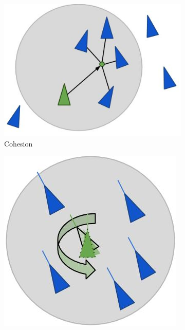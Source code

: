 \begin{figure}[h]
    \centering
    \begin{subfigure}[b]{0.3\textwidth}
        \centering
        \includegraphics[width=\textwidth]{images/boid_cohesion}
        \caption{Cohesion}
        \label{fig:boid_coh}
    \end{subfigure}
    \hfill
    \begin{subfigure}[b]{0.23\textwidth}
        \centering
        \includegraphics[width=\textwidth]{images/boid_alignment}

\end{subfigure}
\end{figure}
